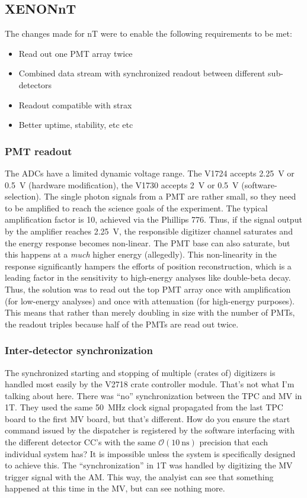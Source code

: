 \subsection{XENONnT}

The changes made for nT were to enable the following requirements to be met:
\begin{itemize}
  \item Read out one PMT array twice
  \item Combined data stream with synchronized readout between different sub-detectors
  \item Readout compatible with strax
  \item Better uptime, stability, etc etc
\end{itemize}

\subsubsection{PMT readout}

The ADCs have a limited dynamic voltage range.
The V1724 accepts \SI{2.25}{\volt} or \SI{0.5}{\volt} (hardware modification), the V1730 accepts \SI{2}{\volt} or \SI{0.5}{\volt} (software-selection).
The single photon signals from a PMT are rather small, so they need to be amplified to reach the science goals of the experiment.
The typical amplification factor is 10, achieved via the Phillips 776.
Thus, if the signal output by the amplifier reaches \SI{2.25}{\volt}, the responsible digitizer channel saturates and the energy response becomes non-linear.
The PMT base can also saturate, but this happens at a \emph{much} higher energy (allegedly).
This non-linearity in the response significantly hampers the efforts of position reconstruction, which is a leading factor in the sensitivity to high-energy analyses like double-beta decay.
Thus, the solution was to read out the top PMT array once with amplification (for low-energy analyses) and once with attenuation (for high-energy purposes).
This means that rather than merely doubling in size with the number of PMTs, the readout triples because half of the PMTs are read out twice.

\subsubsection{Inter-detector synchronization}

The synchronized starting and stopping of multiple (crates of) digitizers is handled most easily by the V2718 crate controller module.
That's not what I'm talking about here.
There was ``no'' synchronization between the TPC and MV in 1T.
They used the same \SI{50}{\mega\hertz} clock signal propagated from the last TPC board to the first MV board, but that's different.
How do you ensure the start command issued by the dispatcher is registered by the software interfacing with the different detector CC's with the same $\mathcal{O}(\SI{10}{\nano\second})$ precision that each individual system has?
It is impossible unless the system is specifically designed to achieve this.
The ``synchronization'' in 1T was handled by digitizing the MV trigger signal with the AM.
This way, the analyist can see that something happened at this time in the MV, but can see nothing more.

